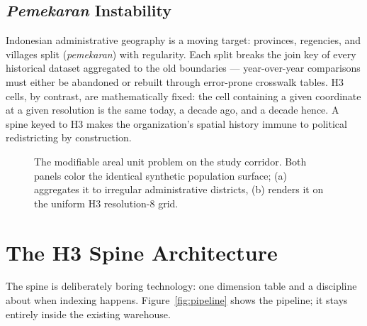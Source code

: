 \documentclass[11pt,a4paper,twocolumn]{article}
\begin{document}
\subsection{\emph{Pemekaran} Instability}

Indonesian administrative geography is a moving target: provinces,
regencies, and villages split (\emph{pemekaran}) with regularity. Each
split breaks the join key of every historical dataset aggregated to the
old boundaries --- year-over-year comparisons must either be abandoned or
rebuilt through error-prone crosswalk tables. H3 cells, by contrast, are
mathematically fixed: the cell containing a given coordinate at a given
resolution is the same today, a decade ago, and a decade hence. A spine
keyed to H3 makes the organization's spatial history immune to political
redistricting by construction.

\begin{figure}[!tp]
  \centering
  
  \caption{The modifiable areal unit problem on the study corridor. Both
    panels color the identical synthetic population surface; (a) aggregates
    it to irregular administrative districts, (b) renders it on the uniform
    H3 resolution-8 grid.}
  \label{fig:maup}
\end{figure}

\section{The H3 Spine Architecture}
\label{sec:architecture}

The spine is deliberately boring technology: one dimension table and a
discipline about when indexing happens. Figure~\ref{fig:pipeline} shows
the pipeline; it stays entirely inside the existing warehouse.
\end{document}
